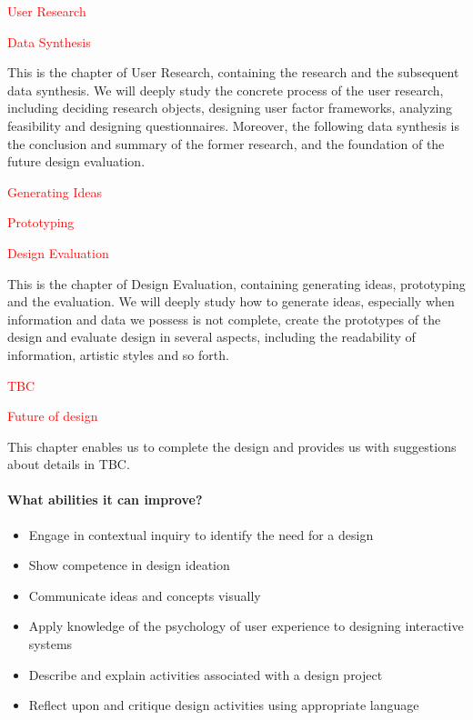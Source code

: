 \documentclass[12pt, a4paper]{article}
\begin{document}
\centerline {\textcolor{red}{User Research}}

\centerline {\textcolor{red}{Data Synthesis}}

This is the chapter of User Research, containing the research and the subsequent data synthesis. We will deeply study the concrete process of the user research, including deciding research objects, designing user factor frameworks, analyzing feasibility and designing questionnaires. Moreover, the following data synthesis is the conclusion and summary of the former research, and the foundation of the future design evaluation. 

\centerline {\textcolor{red}{Generating Ideas}}

\centerline {\textcolor{red}{Prototyping}}

\centerline {\textcolor{red}{Design Evaluation}}

This is the chapter of Design Evaluation, containing generating ideas, prototyping and the evaluation. We will deeply study how to generate ideas, especially when information and data we possess is not complete, create the prototypes of the design and evaluate design in several aspects, including the readability of information, artistic styles and so forth. 

\centerline {\textcolor{red}{TBC}}

\centerline {\textcolor{red}{Future of design}}

This chapter enables us to complete the design and provides us with suggestions about details in TBC.

	\paragraph {What abilities it can improve?}

	\begin{itemize}
	  \item Engage in contextual inquiry to identify the need for a design
	  \item Show competence in design ideation
	  \item Communicate ideas and concepts visually
	  \item Apply knowledge of the psychology of user experience to designing interactive systems
	  \item Describe and explain activities associated with a design project
	  \item Reflect upon and critique design activities using appropriate language
	\end{itemize}
\end{document}
